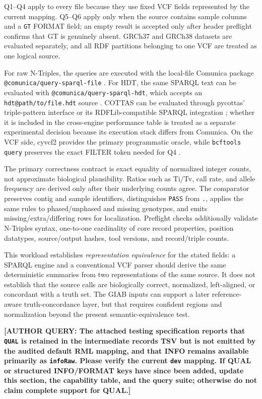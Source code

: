 \documentclass[pdflatex,sn-mathphys-num]{sn-jnl}%
\newenvironment{revision}{\begingroup\color{revisionblue}}{\endgroup}%
\newcommand{\authorquery}[1]{%
  \par\smallskip\noindent
  {\color{queryorange}\textbf{[AUTHOR QUERY: #1]}}%
  \par\smallskip
}%
\theoremstyle{thmstyleone}%
\theoremstyle{thmstyletwo}%
\theoremstyle{thmstylethree}%
\begin{document}
\begin{revision}
Q1--Q4 apply to every file because they use fixed VCF fields represented by the current mapping. Q5--Q6 apply only when the source contains sample columns and a \texttt{GT} FORMAT field; an empty result is accepted only after header preflight confirms that GT is genuinely absent. GRCh37 and GRCh38 datasets are evaluated separately, and all RDF partitions belonging to one VCF are treated as one logical source.

For raw N-Triples, the queries are executed with the local-file Comunica package \texttt{@comunica/query-sparql-file} \cite{Taelman2018Comunica,comunica_file_docs_2026}. For HDT, the same SPARQL text can be evaluated with \texttt{@comunica/query-sparql-hdt}, which accepts an \texttt{hdt@path/to/file.hdt} source \cite{comunica_hdt_docs_2026}. COTTAS can be evaluated through pycottas' triple-pattern interface or its RDFLib-compatible SPARQL integration \cite{cottas_2025,pycottas_2026}; whether it is included in the cross-engine performance table is treated as a separate experimental decision because its execution stack differs from Comunica. On the VCF side, cyvcf2 provides the primary programmatic oracle, while \texttt{bcftools query} preserves the exact FILTER token needed for Q4 \cite{BCFtools,cyvcf2_2017}.

The primary correctness contract is exact equality of normalized integer counts, not approximate biological plausibility. Ratios such as Ti/Tv, call rate, and allele frequency are derived only after their underlying counts agree. The comparator preserves contig and sample identifiers, distinguishes \texttt{PASS} from \texttt{.}, applies the same rules to phased/unphased and missing genotypes, and emits missing/extra/differing rows for localization. Preflight checks additionally validate N-Triples syntax, one-to-one cardinality of core record properties, position datatypes, source/output hashes, tool versions, and record/triple counts.

This workload establishes \emph{representation equivalence} for the stated fields: a SPARQL engine and a conventional VCF parser should derive the same deterministic summaries from two representations of the same source. It does not establish that the source calls are biologically correct, normalized, left-aligned, or concordant with a truth set. The GIAB inputs can support a later reference-aware truth-concordance layer, but that requires confident regions and normalization beyond the present semantic-equivalence test.
\end{revision}
\authorquery{The attached testing specification reports that \texttt{QUAL} is retained in the intermediate records TSV but is not emitted by the audited default RML mapping, and that INFO remains available primarily as \texttt{infoRaw}. Please verify the current \texttt{dev} mapping. If QUAL or structured INFO/FORMAT keys have since been added, update this section, the capability table, and the query suite; otherwise do not claim complete support for QUAL.}
\end{document}
